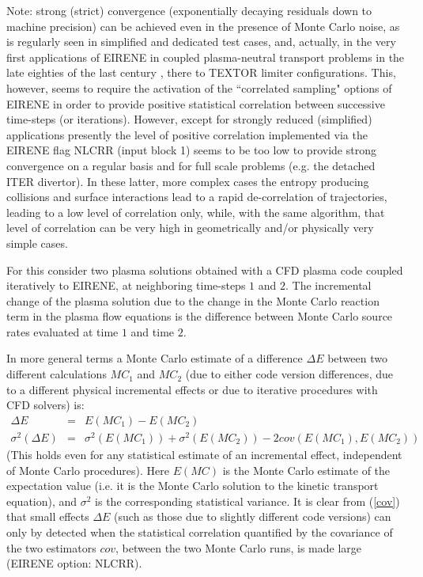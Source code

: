 Note:  strong (strict) convergence (exponentially decaying residuals down to machine precision)
can be achieved even in the presence of Monte Carlo noise, as is regularly
seen in simplified and dedicated test cases, and, actually, in the very first applications of EIRENE in coupled
plasma-neutral transport problems in the late eighties of the last century \cite{kn:Gerhauser88a}, there to TEXTOR limiter configurations.
This, however, seems to require the activation of the ``correlated sampling" options of EIRENE
in order to provide positive statistical correlation between successive time-steps (or iterations).
However, except for strongly reduced (simplified) applications presently the level of positive correlation implemented via the EIRENE flag NLCRR (input block 1) seems
to be too low  to provide strong convergence on a regular basis and for full scale problems (e.g. the detached ITER divertor).
In these latter, more complex cases the entropy producing collisions and surface interactions lead to a rapid de-correlation
of trajectories, leading to a low level of correlation only, while, with the same algorithm, that level of correlation
can be very high in geometrically and/or physically very simple cases.
\\
\medskip

For this consider two plasma solutions obtained with a CFD plasma code coupled iteratively to EIRENE,
at neighboring time-steps $1$ and $2$.
The incremental change of the plasma solution due to the change in the Monte Carlo reaction term in the plasma flow equations is the
difference between Monte Carlo source rates evaluated at time $1$ and time $2$.


In more general terms a Monte Carlo estimate  of a difference $\Delta E$ between two different calculations $MC_1$ and $MC_2$ (due to either code version differences, due to a different physical incremental effects or due to iterative procedures with CFD solvers) is:
\begin{eqnarray}\label{cov}
\Delta E &=&  E(MC_1) - E(MC_2)  \nonumber \\
\sigma^2(\Delta E) &=& \sigma^2(E(MC_1)) + \sigma^2(E(MC_2)) - 2 cov(E(MC_1),E(MC_2))
\end{eqnarray}
(This holds even for any statistical estimate of an incremental effect, independent of Monte Carlo procedures).
Here $E(MC)$ is the Monte Carlo estimate of the expectation value (i.e. it is the Monte Carlo solution to the kinetic transport equation),
and $\sigma^2$ is the corresponding statistical variance.
It is clear from (\ref{cov}) that small effects $\Delta E$ (such as those due to slightly different code versions) can only by detected when the statistical correlation quantified by the covariance of the two estimators $cov$, between the two Monte Carlo runs, is made large (EIRENE option: NLCRR).

